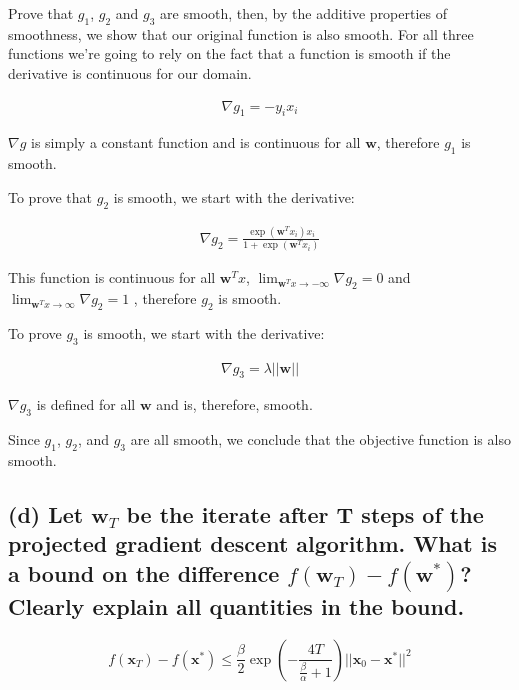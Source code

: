 \documentclass{article}
\begin{document}
Prove that $g_1$, $g_2$ and $g_3$ are smooth, then, by the additive properties of smoothness, we show that our original function is also smooth.  For all three functions we're going to rely on the fact that a function is smooth if the derivative is continuous for our domain.

\begin{equation}
\begin{aligned}
\nabla g_1 = -y_i x_i
\end{aligned}
\end{equation}

$\nabla g$ is simply a constant function and is continuous for all $\mathbf{w}$, therefore $g_1$ is smooth.

To prove that $g_2$ is smooth, we start with the derivative:

\begin{equation}
\begin{aligned}
\nabla g_2 = \frac{ \exp(\mathbf{w}^Tx_i) x_i }{1 + \exp( \mathbf{w}^Tx_i )}
\end{aligned}
\end{equation}

This function is continuous for all $\mathbf{w}^Tx$,  $\lim_{{\mathbf{w}^Tx}\to -\infty} \nabla g_2 = 0$ and $\lim_{{\mathbf{w}^Tx}\to\infty} \nabla g_2 = 1$ , therefore $g_2$ is smooth.

To prove $g_3$ is smooth, we start with the derivative:

\begin{equation}
\begin{aligned}
\nabla g_3 = \lambda || \mathbf{w} ||
\end{aligned}
\end{equation}

$\nabla g_3$ is defined for all $\mathbf{w}$ and is, therefore, smooth.

Since $g_1$, $g_2$, and $g_3$ are all smooth, we conclude that the objective function is also smooth.

\subsection{(d) Let $\mathbf{w}_T$ be the iterate after T steps of the projected gradient descent algorithm. What is a bound on the difference $f(\mathbf{w}_T) - f( \mathbf{w}^*)$? Clearly explain all quantities in the bound.}

\begin{equation}
f(\mathbf{x}_T) - f(\mathbf{x}^*) \leq \frac\beta2 \exp (- \frac{ 4T }{ \frac\beta\alpha + 1 }) ||\mathbf{x}_0 - \mathbf{x}^*||^2
\end{equation}
\end{document}
